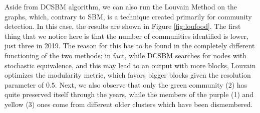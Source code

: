 Aside from DCSBM algorithm, we can also run the Louvain Method on the graphs, which, contrary to SBM, is a technique created primarily for community detection. In this case, the results are shown in Figure \ref{fig:loufood}. The first thing that we notice here is that the number of communities identified is lower, just three in 2019. The reason for this has to be found in the completely different functioning of the two methods: in fact, while DCSBM searches for nodes with stochastic equivalence, and this may lead to an output with more blocks, Louvain optimizes the modularity metric, which favors bigger blocks given the resolution parameter of $0.5$. Next, we also observe that only the green community (2) has quite preserved itself through the years, while the members of the purple (1) and yellow (3) ones come from different older clusters which have been dismembered.



